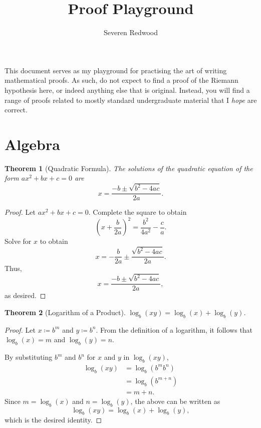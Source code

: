 \documentclass[headings=standardclasses]{scrartcl}
\title{Proof Playground}
\author{Severen Redwood}
\date{}
\newtheorem{theorem}{Theorem}
\theoremstyle{definition}
\begin{document}
\maketitle

\noindent This document serves as my playground for practising the art of
writing mathematical proofs. As such, do not expect to find a proof of the
Riemann hypothesis here, or indeed anything else that is original. Instead, you
will find a range of proofs related to mostly standard undergraduate material
that I \textit{hope} are correct.

\section*{Algebra}

\begin{theorem}[Quadratic Formula]
  The solutions of the quadratic equation of the form \(ax^2 + bx + c = 0\) are
  \[ x = \frac{-b ±\sqrt{b^2 - 4ac}}{2a}. \]
\end{theorem}

\begin{proof}
  Let \(ax^{2} + bx + c = 0\). Complete the square to obtain
  \begin{equation*}
    {\left(x + \frac{b}{2a}\right)}^2 = \frac{b^{2}}{4a^{2}} - \frac{c}{a}.
  \end{equation*}
  Solve for \(x\) to obtain
  \begin{equation*}
    x = -\frac{b}{2a} ±\frac{\sqrt{b^2 - 4ac}}{2a}.
  \end{equation*}
  Thus,
  \begin{equation*}
    x = \frac{-b ± \sqrt{b^2 - 4ac}}{2a},
  \end{equation*}
  as desired.
\end{proof}

\begin{theorem}[Logarithm of a Product]
  \(\displaystyle \log_{b}(xy) = \log_{b}(x) + \log_{b}(y)\).
\end{theorem}

\begin{proof}
  Let \(x ≔ b^m\) and \(y ≔ b^n\). From the definition of a logarithm, it
  follows that \(\log_b(x) = m\) and \(\log_b(y) = n\).

  By substituting \(b^m\) and \(b^n\) for \(x\) and \(y\) in \(\log_b(xy)\),
  \begin{equation*}
  \begin{split}
    \log_b(xy) &= \log_b(b^{m}b^{n}) \\
               &= \log_b(b^{m + n}) \\
               &= m + n.
  \end{split}
  \end{equation*}
  Since \(m = \log_b(x)\) and \(n = \log_b(y)\), the above can be written as
  \begin{equation*}
    \log_b(xy) = \log_b(x) + \log_b(y),
  \end{equation*}
  which is the desired identity.
\end{proof}
\end{document}
